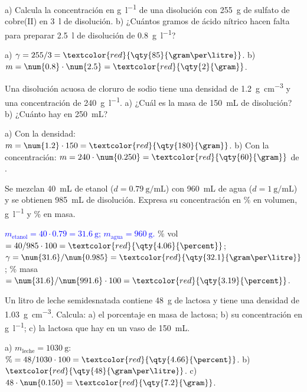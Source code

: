 \begin{exercise}
    a) Calcula la concentración en \unit{\gram\per\litre} de una disolución con \qty{255}{\gram} de sulfato de cobre(II) en
    \qty{3}{\litre} de disolución. b) ¿Cuántos gramos de ácido nítrico hacen falta para preparar \qty{2.5}{\litre} de disolución
    de \qty{0.8}{\gram\per\litre}?
    \begin{solu}
        a) \(\gamma = 255/3 = \textcolor{red}{\qty{85}{\gram\per\litre}}\). b) \(m = \num{0.8} \cdot \num{2.5} = \textcolor{red}{\qty{2}{\gram}}\).
    \end{solu}
\end{exercise}

\begin{exercise}
    Una disolución acuosa de cloruro de sodio tiene una densidad de \qty{1.2}{\gram\per\cubic\cm} y una concentración de
    \qty{240}{\gram\per\litre}. a) ¿Cuál es la masa de \qty{150}{\mL} de disolución? b) ¿Cuánto  hay en
    \qty{250}{\mL}?
    \begin{solu}
        a) Con la densidad: \(m = \num{1.2} \cdot 150 = \textcolor{red}{\qty{180}{\gram}}\). b) Con la concentración:
        \(m = 240 \cdot \num{0.250} = \textcolor{red}{\qty{60}{\gram}}\) de .
    \end{solu}
\end{exercise}

\begin{exercise}
    \label{ej:ud2-etanol}
    Se mezclan \qty{40}{\mL} de etanol (\(d = \qty{0.79}{\gram\per\mL}\)) con \qty{960}{\mL} de agua
    (\(d = \qty{1}{\gram\per\mL}\)) y se obtienen \qty{985}{\mL} de disolución. Expresa su concentración en \% en volumen,
    \unit{\gram\per\litre} y \% en masa.
    \begin{solu}
        \textcolor{blue}{\(m_{\text{etanol}} = 40 \cdot \num{0.79} = \qty{31.6}{\gram}\); \(m_{\text{agua}} = \qty{960}{\gram}\).}
        \% vol \(= 40/985 \cdot 100 = \textcolor{red}{\qty{4.06}{\percent}}\);
        \(\gamma = \num{31.6}/\num{0.985} = \textcolor{red}{\qty{32.1}{\gram\per\litre}}\);
        \% masa \(= \num{31.6}/\num{991.6} \cdot 100 = \textcolor{red}{\qty{3.19}{\percent}}\).
    \end{solu}
\end{exercise}

\begin{exercise}
    Un litro de leche semidesnatada contiene \qty{48}{\gram} de lactosa y tiene una densidad de \qty{1.03}{\gram\per\cubic\cm}.
    Calcula: a) el porcentaje en masa de lactosa; b) su concentración en \unit{\gram\per\litre}; c) la lactosa que hay en un vaso
    de \qty{150}{\mL}.
    \begin{solu}
        a) \(m_{\text{leche}} = \qty{1030}{\gram}\): \(\% = 48/1030 \cdot 100 = \textcolor{red}{\qty{4.66}{\percent}}\).
        b) \(\textcolor{red}{\qty{48}{\gram\per\litre}}\). c) \(48 \cdot \num{0.150} = \textcolor{red}{\qty{7.2}{\gram}}\).
    \end{solu}
\end{exercise}

